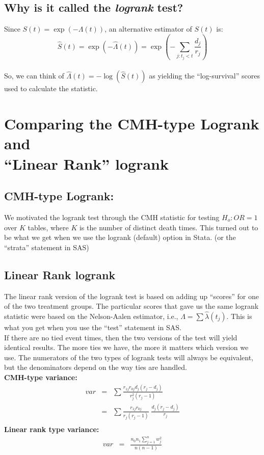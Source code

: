 \documentclass[11pt,slidesonly,semrot,portrait,palatino]{book}
\begin{document}
{\subsection{Why is it called the {\it logrank} test?}
Since $S(t) = \exp(-\Lambda(t))$, an alternative estimator of $S(t)$ is:
\[  \hat{S}(t) = \exp(-\hat\Lambda(t)) = \exp( - \sum_{j: t_j<t} \frac{d_j}{r_j})\]
\\[2ex]
So,  we can think of $\hat\Lambda(t)=-\log(\hat{S}(t))$ as yielding the
``log-survival'' scores used to calculate the statistic.
\section{Comparing the CMH-type Logrank and\\ ``Linear Rank'' logrank}
\subsection{CMH-type Logrank:}
We motivated the logrank test through the CMH statistic for
testing $H_o: OR=1$ over $K$ tables, where $K$ is the number
of distinct death times.  This turned out to be what we get
when we use the logrank (default) option in Stata. (or the
``{\sc strata}'' statement in SAS)
\subsection{Linear Rank logrank}
The linear rank version of the logrank test is based
on adding up ``scores'' for one of the two treatment groups.
The particular scores that gave us the same logrank statistic were
based on the Nelson-Aalen estimator, i.e.,
$\hat\Lambda = \sum \hat\lambda(t_j)$.
This is what you get when you use the ``{\sc test}''
statement in SAS.
\\[2ex]
If there are no tied event times, then the two versions of the
test will yield identical results.  The more ties we have, the
more it matters which version we use.   The numerators of the two types
of logrank tests will always be equivalent, but the denominators
depend on the way ties are handled.
\\[2ex]
{\bf CMH-type variance:}
\begin{eqnarray*}
var & = & \sum \frac{r_{1j} r_{0j} d_j (r_j-d_j)}{r_j^2(r_j-1)}\\
    & = & \sum \frac{r_{1j} r_{0j}}{r_j (r_j-1)} \; \frac{d_j (r_j-d_j)}{r_j}\\
\end{eqnarray*}
{\bf Linear rank type variance:}
\begin{eqnarray*}
var & = & \frac{n_0 n_1 \sum_{j=1}^{n} w_j^2 }{n(n-1)}
\end{eqnarray*}
}
\end{document}

